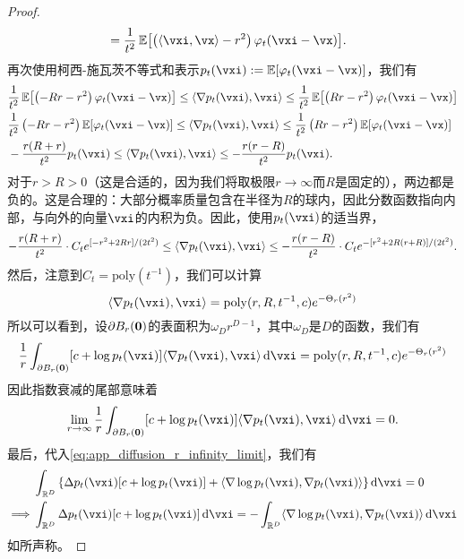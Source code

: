\documentclass[../../book-main.tex]{subfiles}
\begin{document}
\begin{proof}
\begin{align}
        &= \frac{1}{t^{2}}\Ex\rs{\bp{\ip{\vxi}{\vx} - r^{2}}\phi_{t}(\vxi - \vx)}.
    \end{align}
    再次使用柯西-施瓦茨不等式和表示\(p_{t}(\vxi) := \Ex[\phi_{t}(\vxi - \vx)]\)，我们有
    \begin{align}
        &\frac{1}{t^{2}}\Ex\rs{\bp{-Rr - r^{2}}\phi_{t}(\vxi - \vx)} \leq \ip{\nabla p_{t}(\vxi)}{\vxi} \leq \frac{1}{t^{2}}\Ex\rs{\bp{Rr - r^{2}}\phi_{t}(\vxi - \vx)} \\
        &\frac{1}{t^{2}}\bp{-Rr - r^{2}}\Ex\rs{\phi_{t}(\vxi - \vx)} \leq \ip{\nabla p_{t}(\vxi)}{\vxi} \leq \frac{1}{t^{2}}\bp{Rr - r^{2}}\Ex\rs{\phi_{t}(\vxi - \vx)} \\
        &-\frac{r(R + r)}{t^{2}}p_{t}(\vxi) \leq \ip{\nabla p_{t}(\vxi)}{\vxi} \leq -\frac{r(r - R)}{t^{2}}p_{t}(\vxi).
    \end{align}
    对于\(r > R > 0\)（这是合适的，因为我们将取极限\(r \to \infty\)而\(R\)是固定的），两边都是负的。这是合理的：大部分概率质量包含在半径为\(R\)的球内，因此分数函数指向内部，与向外的向量\(\vxi\)的内积为负。因此，使用\(p_{t}(\vxi)\)的适当界，
    \begin{equation}
        -\frac{r(R + r)}{t^{2}}\cdot C_{t}e^{[-r^{2} + 2Rr]/(2t^{2})} \leq \ip{\nabla p_{t}(\vxi)}{\vxi} \leq -\frac{r(r - R)}{t^{2}}\cdot C_{t}e^{-[r^{2} + 2R(r + R)]/(2t^{2})}.
    \end{equation}
    然后，注意到\(C_{t} = \mathrm{poly}(t^{-1})\)，我们可以计算
    \begin{equation}
        [c + \log p_{t}(\vxi)]\ip{\nabla p_{t}(\vxi)}{\vxi} = \mathrm{poly}(r, R, t^{-1}, c)e^{-\Theta_{r}(r^{2})}
    \end{equation}
    所以可以看到，设\(\partial B_{r}(\bm{0})\)的表面积为\(\omega_{D} r^{D - 1}\)，其中\(\omega_{D}\)是\(D\)的函数，我们有
    \begin{equation}
        \frac{1}{r}\int_{\partial B_{r}(\vzero)}[c + \log p_{t}(\vxi)]\ip{\nabla p_{t}(\vxi)}{\vxi}\odif{\vxi} = \mathrm{poly}(r, R, t^{-1}, c)e^{-\Theta_{r}(r^{2})}
    \end{equation}
    因此指数衰减的尾部意味着
    \begin{equation}
        \lim_{r \to \infty}\frac{1}{r}\int_{\partial B_{r}(\vzero)}[c + \log p_{t}(\vxi)]\ip{\nabla p_{t}(\vxi)}{\vxi}\odif{\vxi} = 0.
    \end{equation}
    最后，代入\eqref{eq:app_diffusion_r_infinity_limit}，我们有
    \begin{align}
        &\int_{\R^{D}}\bc{\Delta p_{t}(\vxi)[c + \log p_{t}(\vxi)] + \ip{\nabla \log p_{t}(\vxi)}{\nabla p_{t}(\vxi)}}\odif{\vxi} = 0 \\
        \implies 
        &\int_{\R^{D}}\Delta p_{t}(\vxi)[c + \log p_{t}(\vxi)]\odif{\vxi} = -\int_{\R^{D}}\ip{\nabla \log p_{t}(\vxi)}{\nabla p_{t}(\vxi)}\odif{\vxi}
    \end{align}
    如所声称。
\end{proof}
\end{document}
